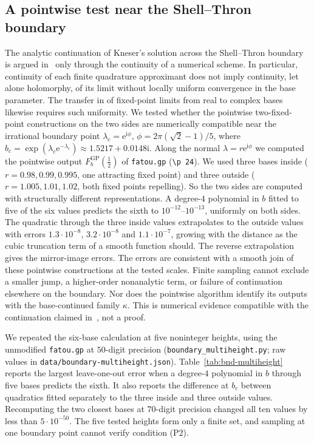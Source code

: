 \documentclass[11pt]{amsart}
\theoremstyle{definition}
\newcommand{\eee}{\mathrm{e}}
\newcommand{\ii}{\mathrm{i}}
\begin{document}
\subsection{A pointwise test near the Shell--Thron boundary}\label{sec:bndtest}
The analytic continuation of Kneser's solution across the Shell--Thron boundary is
argued in~\cite[\S5]{Paulsen2019} only through the continuity of a numerical
scheme.  In particular, continuity of each finite quadrature approximant
does not imply continuity, let alone holomorphy, of its limit without
locally uniform convergence in the base parameter.  The transfer in
\cite[Prop.~3]{Paulsen2019} of fixed-point limits from real to complex
bases likewise requires such uniformity.  We tested whether the pointwise
two-fixed-point constructions on the two sides are numerically compatible
near the irrational boundary point
$\lambda_c=\eee^{\ii\phi}$, $\phi=2\pi(\sqrt2-1)/5$, where
$b_c=\exp(\lambda_c\eee^{-\lambda_c})\approx1.5217+0.0148\ii$.  Along the normal
$\lambda=r\eee^{\ii\phi}$ we computed the pointwise output
$F_b^{\mathrm{GP}}(\tfrac12)$ of \texttt{fatou.gp}
(\texttt{\textbackslash p 24}).  We used three bases inside
($r=0.98,0.99,0.995$, one attracting fixed point) and three outside
($r=1.005,1.01,1.02$, both fixed points repelling).  So the two sides are
computed with structurally different representations.  A degree-$4$ polynomial
in $b$ fitted to five of the six values predicts the sixth to
$10^{-12}$--$10^{-13}$, uniformly on both sides.  The quadratic through the three
inside values extrapolates to the outside values with errors
$1.3\cdot10^{-8}$, $3.2\cdot10^{-8}$ and $1.1\cdot10^{-7}$, growing with the
distance as the cubic truncation term of a smooth function should.  The reverse
extrapolation gives the mirror-image errors.  The errors are consistent with
a smooth join of these pointwise constructions at the tested scales.
Finite sampling cannot exclude a smaller
jump, a higher-order nonanalytic term, or failure of continuation elsewhere
on the boundary.  Nor does the pointwise algorithm identify its outputs
with the base-continued family $\kappa$.  This is numerical evidence
compatible with the continuation claimed in~\cite{Paulsen2019}, not a proof.

We repeated the six-base calculation at five noninteger heights, using the
unmodified \texttt{fatou.gp} at $50$-digit precision
(\nolinkurl{boundary_multiheight.py}; raw values in
\nolinkurl{data/boundary-multiheight.json}).  Table~\ref{tab:bnd-multiheight}
reports the largest leave-one-out error when a degree-$4$ polynomial in $b$
through five bases predicts the sixth.  It also reports the difference at
$b_c$ between quadratics fitted separately to the three inside and three
outside values.  Recomputing the two closest bases at $70$-digit precision
changed all ten values by less than $5\cdot10^{-50}$.
The five tested heights form only a finite set, and sampling at one
boundary point cannot verify condition (P2).
\end{document}
